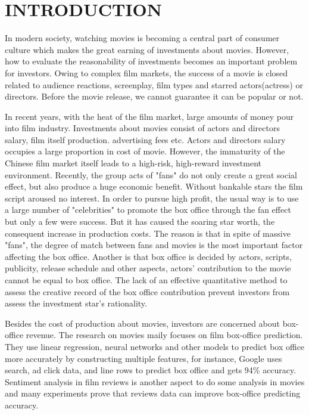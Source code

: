 \section{INTRODUCTION}
\par In modern society, watching movies is becoming a central part of consumer culture which makes the great earning of investments about movies. However, how to evaluate the reasonability of investments becomes an important problem for investors. Owing to complex film markets,  the success of a movie is closed related to audience reactions, screenplay, film types and starred actors(actress) or directors.  Before the movie release, we cannot guarantee it can be popular or not.
\par In recent years, with the heat of the film market, large amounts of money pour into film industry. Investments about movies consist of actors and directors salary,  film itself production. advertising fees etc. Actors and directors salary occupies a large proportion in cost of movie. However, the immaturity of the Chinese film market itself leads to a high-risk, high-reward investment environment.  Recently, the group acts of "fans" do not only create a great social effect, but also produce a huge economic benefit. Without bankable stars the film script aroused no interest. In order to pursue high profit, the usual way is to use a large number of "celebrities" to promote the box office through the fan effect but only a few were success. But it has caused the soaring star worth, the consequent increase in production costs. The reason is that in spite of massive "fans", the degree of match between fans and movies is the most important factor affecting the box office. Another is that box office is decided by actors, scripts, publicity, release schedule and other aspects, actors' contribution to the movie cannot be equal to box office. The lack of an effective quantitative method to assess the creative record of the box office contribution prevent investors from assess the investment star's rationality.
\par Besides the cost of production about movies, investors are concerned about box-office revenue. The research on movies maily focuses on film box-office prediction\cite{marshall2013forecasting,basuroy2003critical,asur2010predicting}. They use linear regression, neural networks\cite{sharda2006predicting} and other models to predict box office more accurately by constructing multiple features, for instance, Google \cite{panaligan2013quantifying} uses search, ad click data, and line rows to predict box office and gets 94\% accuracy. Sentiment analysis in film reviews \cite{manek2017aspect,kiritchenko2014sentiment,pang2008opinion} is another aspect to do some analysis in movies and many experiments\cite{gemser2007impact,joshi2010movie} prove that reviews data can improve box-office predicting accuracy.
